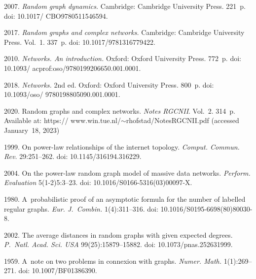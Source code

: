  \begin{multicols}{2}

\renewcommand{\bibname}{\protect\rmfamily References}

{\small\frenchspacing
 {%
 \begin{thebibliography}{99} 
 2007. \textit{Random graph dynamics.} Cambridge: Cambridge University
Press. 221~p. doi: 10.1017/ CBO9780511546594.

 2017. \textit{Random graphs and complex networks.} Cambridge:
Cambridge University Press.   Vol.~1. 337~p. doi: 10.1017/9781316779422.

 2010. \textit{Networks. An introduction.} Oxford: Oxford
University Press. 772~p. doi: 10.1093/ acprof:oso/9780199206650.001.0001.

 2018. \textit{Networks.} 2nd ed. Oxford: Oxford
University Press. 800~p. doi: 10.1093/oso/ 9780198805090.001.0001.

 2020. Random graphs and complex networks.  \textit{Notes RGCNII}. Vol.~2. 314~p.
Available at: {\sf https:// www.win.tue.nl/$\sim$rhofstad/NotesRGCNII.pdf} (accessed January~18, 2023)



 1999. On power-law relationships of
the internet topology. \textit{Comput. Commun. Rev.} 29:251--262.
doi: 10.1145/316194.316229.

 2004. On the power-law random graph model of massive data
networks. \textit{Perform. Evaluation} 5(1-2)5:3--23.
doi: 10.1016/S0166-5316(03)00097-X.

 1980. A~probabilistic proof of an asymptotic formula for the number
of labelled regular graphs. \textit{Eur. J.~Combin.} 1(4):311--316.
doi: 10.1016/S0195-6698(80)80030-8.

 2002. The average distances in random graphs with given expected
degrees. \textit{P.~Natl. Acad. Sci. USA} 99(25):15879--15882.
doi: 10.1073/pnas.252631999.

 1959. A~note on two problems in connexion with graphs.
\textit{Numer. Math.} 1(1):269--271. doi: 10.1007/BF01386390.
\end{thebibliography}

 }
 }

\end{multicols}

